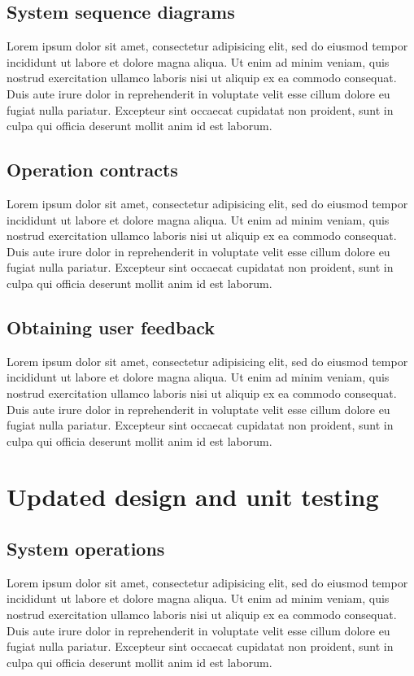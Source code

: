 \documentclass[12pt,a4paper]{article}
\begin{document}
\subsection{System sequence diagrams}
Lorem ipsum dolor sit amet, consectetur adipisicing elit, sed do eiusmod tempor incididunt ut labore et dolore magna aliqua. Ut enim ad minim veniam, quis nostrud exercitation ullamco laboris nisi ut aliquip ex ea commodo consequat. Duis aute irure dolor in reprehenderit in voluptate velit esse cillum dolore eu fugiat nulla pariatur. Excepteur sint occaecat cupidatat non proident, sunt in culpa qui officia deserunt mollit anim id est laborum.

\subsection{Operation contracts}
Lorem ipsum dolor sit amet, consectetur adipisicing elit, sed do eiusmod tempor incididunt ut labore et dolore magna aliqua. Ut enim ad minim veniam, quis nostrud exercitation ullamco laboris nisi ut aliquip ex ea commodo consequat. Duis aute irure dolor in reprehenderit in voluptate velit esse cillum dolore eu fugiat nulla pariatur. Excepteur sint occaecat cupidatat non proident, sunt in culpa qui officia deserunt mollit anim id est laborum.

\subsection{Obtaining user feedback}
Lorem ipsum dolor sit amet, consectetur adipisicing elit, sed do eiusmod tempor incididunt ut labore et dolore magna aliqua. Ut enim ad minim veniam, quis nostrud exercitation ullamco laboris nisi ut aliquip ex ea commodo consequat. Duis aute irure dolor in reprehenderit in voluptate velit esse cillum dolore eu fugiat nulla pariatur. Excepteur sint occaecat cupidatat non proident, sunt in culpa qui officia deserunt mollit anim id est laborum.

\section{Updated design and unit testing}

\subsection{System operations}
Lorem ipsum dolor sit amet, consectetur adipisicing elit, sed do eiusmod tempor incididunt ut labore et dolore magna aliqua. Ut enim ad minim veniam, quis nostrud exercitation ullamco laboris nisi ut aliquip ex ea commodo consequat. Duis aute irure dolor in reprehenderit in voluptate velit esse cillum dolore eu fugiat nulla pariatur. Excepteur sint occaecat cupidatat non proident, sunt in culpa qui officia deserunt mollit anim id est laborum.
\end{document}
